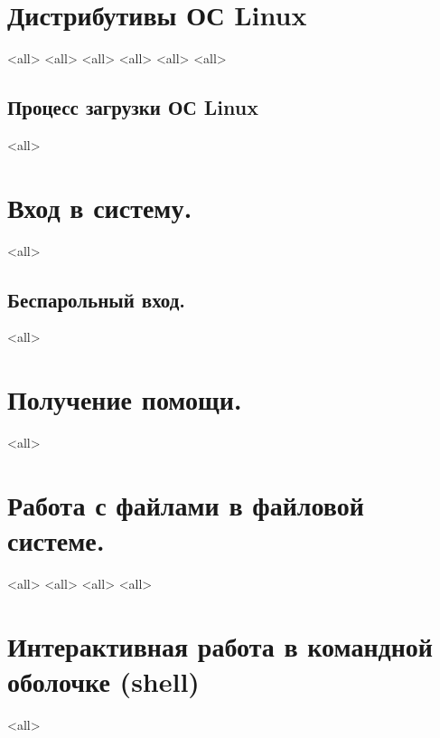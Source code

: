 \section{Дистрибутивы ОС Linux}
\mode<all>{}
\mode<all>{}
\mode<all>{}
\mode<all>{}
\mode<all>{}
\mode<all>{}

\subsection{Процесс загрузки ОС Linux}
\mode<all>{}


\section{Вход в систему.}
\mode<all>{}
\subsection{Беспарольный вход.}
\mode<all>{}


\section{Получение помощи.}
\mode<all>{}

\section{Работа с файлами в файловой системе.}
\mode<all>{}
\mode<all>{}
\mode<all>{}
\mode<all>{}
\section{Интерактивная работа в командной оболочке (shell)}
\mode<all>{}

\bye

